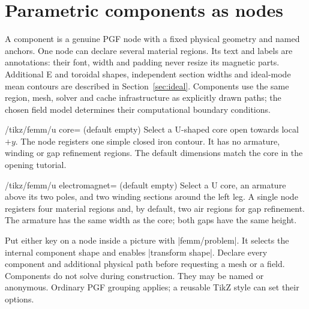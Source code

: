 \section{Parametric components as nodes}
\label{sec:components}
A component is a genuine PGF node with a fixed physical geometry and named
anchors. One node can declare several material regions. Its text and labels
are annotations: their font, width and padding never resize its magnetic
parts. Additional E and toroidal shapes, independent section widths and ideal-mode
mean contours are described in Section~\ref{sec:ideal}.
Components use the same region, mesh, solver and cache infrastructure
as explicitly drawn paths; the chosen field model determines their computational boundary conditions.

\begin{key}{/tikz/femm/u core= (default \normalfont empty)}
Select a U-shaped core open towards local $+y$. The node registers one
simple closed iron contour. It has no armature, winding or gap refinement
regions. The default dimensions match the core in the opening tutorial.
\end{key}
\begin{key}{/tikz/femm/u electromagnet= (default \normalfont empty)}
Select a U core, an armature above its two poles, and two winding sections
around the left leg. A single node registers four material regions and,
by default, two air regions for gap refinement.
The armature has the same width as the core; both gaps have the same height.
\end{key}

Put either key on a node inside a picture with |femm/problem|. It selects
the internal component shape and enables |transform shape|. Declare every
component and additional physical path before requesting a mesh or a field.
Components do not solve during construction. They may be named or anonymous.
Ordinary PGF grouping applies; a reusable TikZ style can set their options.

\begin{codeexample}[width=6cm]
\end{codeexample}

